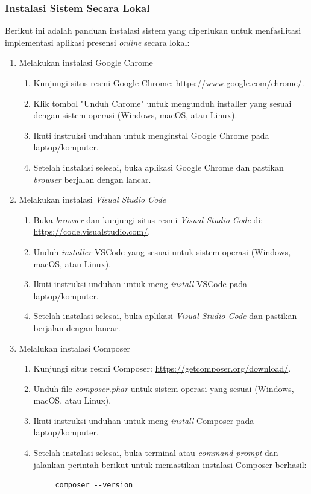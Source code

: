 \subsubsection{Instalasi Sistem Secara Lokal}
Berikut ini adalah panduan instalasi sistem yang diperlukan untuk menfasilitasi implementasi aplikasi presensi \textit{online} secara lokal:
\begin{enumerate}
    \item Melakukan instalasi Google Chrome
    \begin{enumerate}
        \item Kunjungi situs resmi Google Chrome: \url{https://www.google.com/chrome/}.
        \item Klik tombol "Unduh Chrome" untuk mengunduh installer yang sesuai dengan sistem operasi (Windows, macOS, atau Linux).
        \item Ikuti instruksi unduhan untuk menginstal Google Chrome pada laptop/komputer.
        \item Setelah instalasi selesai, buka aplikasi Google Chrome dan pastikan \textit{browser} berjalan dengan lancar.
    \end{enumerate}

    \item Melakukan instalasi \textit{Visual Studio Code}
    \begin{enumerate}
        \item Buka \textit{browser} dan kunjungi situs resmi \textit{Visual Studio Code} di: \url{https://code.visualstudio.com/}.
        \item Unduh \textit{installer} VSCode yang sesuai untuk sistem operasi (Windows, macOS, atau Linux).
        \item Ikuti instruksi unduhan untuk meng-\textit{install} VSCode pada laptop/komputer.
        \item Setelah instalasi selesai, buka aplikasi \textit{Visual Studio Code} dan pastikan berjalan dengan lancar.
    \end{enumerate}

    \item Melalukan instalasi Composer
    \begin{enumerate}
        \item Kunjungi situs resmi Composer: \url{https://getcomposer.org/download/}.
        \item Unduh file \textit{composer.phar} untuk sistem operasi yang sesuai (Windows, macOS, atau Linux).
        \item Ikuti instruksi unduhan untuk meng-\textit{install} Composer pada laptop/komputer.
        \item Setelah instalasi selesai, buka terminal atau \textit{command prompt} dan jalankan perintah berikut untuk memastikan instalasi Composer berhasil:
        {\small\begin{verbatim}     composer --version
\end{verbatim}}
    \end{enumerate}
    

\end{enumerate}
